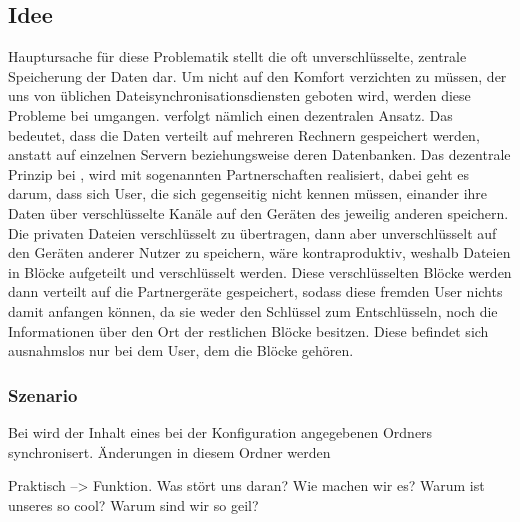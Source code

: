 \subsection{Idee}
Hauptursache für diese Problematik stellt die oft unverschlüsselte, zentrale
Speicherung der Daten dar. Um nicht auf den Komfort verzichten zu müssen, der
uns von üblichen Dateisynchronisationsdiensten geboten wird, werden diese
Probleme bei \sblit umgangen. \sblitg verfolgt nämlich einen dezentralen Ansatz.
Das bedeutet, dass die Daten verteilt auf mehreren Rechnern gespeichert werden,
anstatt auf einzelnen Servern beziehungsweise deren Datenbanken. Das dezentrale
Prinzip bei \sblit, wird mit sogenannten Partnerschaften realisiert, dabei geht
es darum, dass sich User, die sich gegenseitig nicht kennen müssen, einander
ihre Daten über verschlüsselte Kanäle auf den Geräten des jeweilig anderen
speichern. Die privaten Dateien verschlüsselt zu übertragen, dann aber
unverschlüsselt auf den Geräten anderer Nutzer zu speichern, wäre
kontraproduktiv, weshalb Dateien in Blöcke aufgeteilt und verschlüsselt werden.
Diese verschlüsselten Blöcke werden dann verteilt auf die Partnergeräte
gespeichert, sodass diese fremden User nichts damit anfangen können, da sie
weder den Schlüssel zum Entschlüsseln, noch die Informationen über den Ort der
restlichen Blöcke besitzen. Diese befindet sich ausnahmslos nur bei dem User,
dem die Blöcke gehören.

\subsubsection{Szenario}
Bei \sblit wird der Inhalt eines bei der Konfiguration angegebenen Ordners
synchronisert. Änderungen in diesem Ordner werden 




Praktisch --> Funktion.
Was stört uns daran?
Wie machen wir es?
Warum ist unseres so cool?
Warum sind wir so geil?
